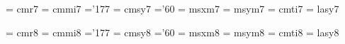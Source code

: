  \font\sevrm  = cmr7               %
 \font\sevmi  = cmmi7              %
    \skewchar\sevmi ='177          %
 \font\sevsy  = cmsy7              %
    \skewchar\sevsy ='60           %
 \font\sevxm  = msxm7		   %
 \font\sevym  = msym7		   %
 \font\sevit  = cmti7              %
 \font\sevly  = lasy7             %

 \font\egtrm  = cmr8               %
 \font\egtmi  = cmmi8              %
    \skewchar\egtmi ='177          %
 \font\egtsy  = cmsy8              %
    \skewchar\egtsy ='60           %
 \font\egtxm  = msxm8		   %
 \font\egtym  = msym8		   %
 \font\egtit  = cmti8              %
 \font\egtly  = lasy8             %

